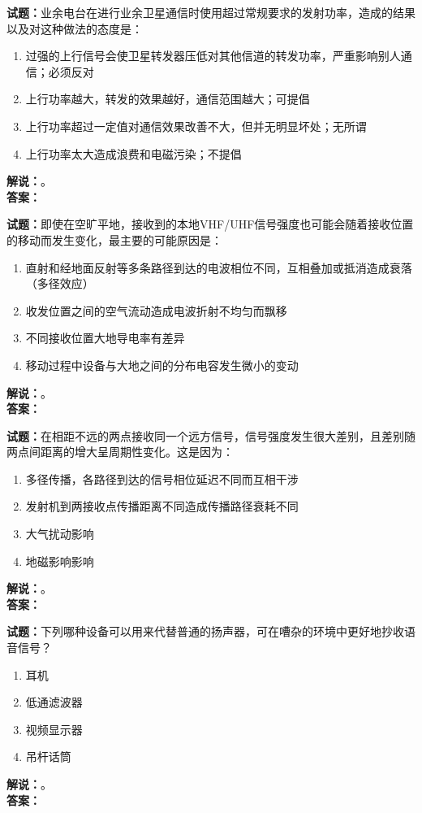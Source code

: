 \documentclass{ctexbook}
\begin{document}
\bigskip

\noindent\textbf{试题：}业余电台在进行业余卫星通信时使用超过常规要求的发射功率，造成的结果以及对这种做法的态度是：
\begin{enumerate}[leftmargin=3em]
  \item 过强的上行信号会使卫星转发器压低对其他信道的转发功率，严重影响别人通信；必须反对
  \item 上行功率越大，转发的效果越好，通信范围越大；可提倡
  \item 上行功率超过一定值对通信效果改善不大，但并无明显坏处；无所谓
  \item 上行功率太大造成浪费和电磁污染；不提倡
\end{enumerate}
\noindent\textbf{解说：}\textbf{}。\\\noindent\textbf{答案：}

\bigskip

\noindent\textbf{试题：}即使在空旷平地，接收到的本地VHF/UHF信号强度也可能会随着接收位置的移动而发生变化，最主要的可能原因是：
\begin{enumerate}[leftmargin=3em]
  \item 直射和经地面反射等多条路径到达的电波相位不同，互相叠加或抵消造成衰落（多径效应）
  \item 收发位置之间的空气流动造成电波折射不均匀而飘移
  \item 不同接收位置大地导电率有差异
  \item 移动过程中设备与大地之间的分布电容发生微小的变动
\end{enumerate}
\noindent\textbf{解说：}\textbf{}。\\\noindent\textbf{答案：}

\bigskip

\noindent\textbf{试题：}在相距不远的两点接收同一个远方信号，信号强度发生很大差别，且差别随两点间距离的增大呈周期性变化。这是因为：
\begin{enumerate}[leftmargin=3em]
  \item 多径传播，各路径到达的信号相位延迟不同而互相干涉
  \item 发射机到两接收点传播距离不同造成传播路径衰耗不同
  \item 大气扰动影响
  \item 地磁影响影响
\end{enumerate}
\noindent\textbf{解说：}\textbf{}。\\\noindent\textbf{答案：}

\bigskip

\noindent\textbf{试题：}下列哪种设备可以用来代替普通的扬声器，可在嘈杂的环境中更好地抄收语音信号？
\begin{enumerate}[leftmargin=3em]
  \item 耳机
  \item 低通滤波器
  \item 视频显示器
  \item 吊杆话筒
\end{enumerate}
\noindent\textbf{解说：}\textbf{}。\\\noindent\textbf{答案：}
\end{document}
